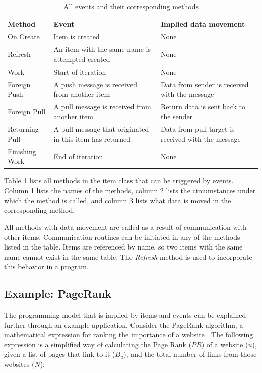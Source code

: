 \documentclass{uit-report}
\begin{document}
\begin{table}[h]
\setlength\arrayrulewidth{1pt}
\renewcommand{\arraystretch}{2}
\begin{tabular}{ | p{3cm} | p{6cm} | p{6cm} |}
   	\hline
   	\textbf{Method} & \textbf{Event} & \textbf{Implied data movement} \\ \hline
   	On Create & Item is created & None\\ \hline
  	Refresh & An item with the same name is attempted created & None \\ \hline
  	Work & Start of iteration & None \\ \hline
   	Foreign Push & A push message is received from another item & Data from sender is received with the message  \\ \hline
   	Foreign Pull & A pull message is received from another item & Return data is sent back to the sender\\ \hline
	Returning Pull & A pull message that originated in this item has returned & Data from pull target is received with the message\\ \hline
	Finishing Work & End of iteration & None\\ \hline

\end{tabular}
\caption{All events and their corresponding methods}
\label{table:events}
\end{table}
\vspace{1.5cm}

Table \ref{table:events} lists all methods in the item class that can be triggered by events. Column 1 lists the names of the methods, column 2 lists the circumstances under which the method is called, and column 3 lists what data is moved in the corresponding method.

All methods with data movement are called as a result of communication with other items. Communication routines can be initiated in any of the methods listed in the table. Items are referenced by name, so two items with the same name cannot exist in the same table. The \emph{Refresh} method is used to incorporate this behavior in a program.
\newpage
\subsection{Example: PageRank} \label{section:examplepagerank}
The programming model that is implied by items and events can be explained further through an example application. Consider the PageRank algorithm, a mathematical expression for ranking the importance of a website \cite{pagerank}. The following expression is a simplified way of calculating the Page Rank ($PR$) of a website ($u$), given a list of pages that link to it ($B_u$), and the total number of links from those websites ($N$):
\end{document}
